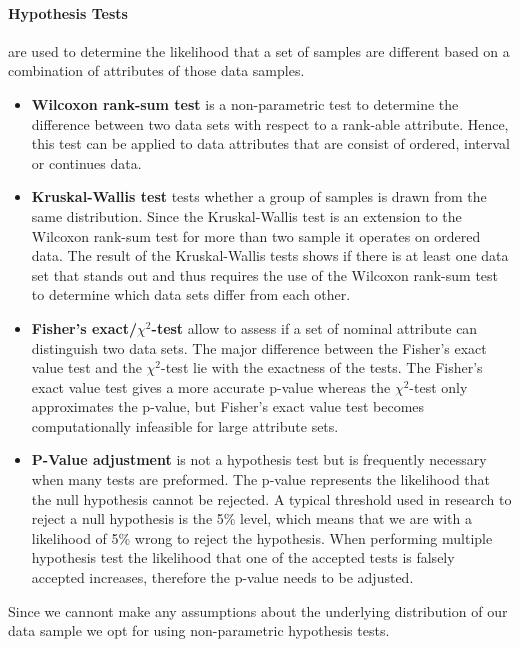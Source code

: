 \paragraph{Hypothesis Tests} are used to determine the likelihood that a set of samples are different based on a combination of attributes of those data samples.

\begin{itemize}
\item\textbf{Wilcoxon rank-sum test} is a non-parametric test to determine the difference between two data sets with respect to a rank-able attribute.
Hence, this test can be applied to data attributes that are consist of ordered, interval or continues data.

\item\textbf{Kruskal-Wallis test} tests whether a group of samples is drawn from the same distribution.
Since the Kruskal-Wallis test is an extension to the Wilcoxon rank-sum test for more than two sample it operates on ordered data.
The result of the Kruskal-Wallis tests shows if there is at least one data set that stands out and thus requires the use of the Wilcoxon rank-sum test to determine which data sets differ from each other.

\item\textbf{Fisher's exact/$\chi^2$-test} allow to assess if a set of nominal attribute can distinguish two data sets. 
The major difference between the Fisher's exact value test and the $\chi^2$-test lie with the exactness of the tests.
The Fisher's exact value test gives a more accurate p-value whereas the $\chi^2$-test only approximates the p-value, but Fisher's exact value test becomes computationally infeasible for large attribute sets.

\item\textbf{P-Value adjustment} is not a hypothesis test but is frequently necessary when many tests are preformed.
The p-value represents the likelihood that the null hypothesis cannot be rejected.
A typical threshold used in research to reject a null hypothesis is the 5\% level, which means that we are with a likelihood of 5\% wrong to reject the hypothesis.
When performing multiple hypothesis test the likelihood that one of the accepted tests is falsely accepted increases, therefore the p-value needs to be adjusted.
\end{itemize}

Since we cannont make any assumptions about the underlying distribution of our data sample we opt for using non-parametric hypothesis tests.


